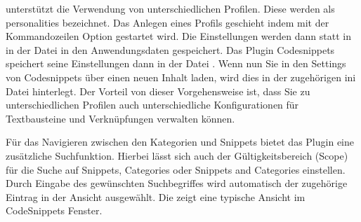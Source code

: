 \codeblocks unterstützt die Verwendung von unterschiedlichen Profilen. Diese werden als personalities bezeichnet. Das Anlegen eines Profils geschieht indem \codeblocks mit der Kommandozeilen Option  gestartet wird. Die Einstellungen werden dann statt in  in der Datei  in den Anwendungsdaten gespeichert. Das Plugin Codesnippets speichert seine Einstellungen dann in der Datei . Wenn nun Sie in den Settings von Codesnippets über  einen neuen Inhalt  laden, wird dies in der zugehörigen ini Datei hinterlegt. Der Vorteil von dieser Vorgehensweise ist, dass Sie zu unterschiedlichen Profilen auch unterschiedliche Konfigurationen für Textbausteine und Verknüpfungen verwalten können.

Für das Navigieren zwischen den Kategorien und Snippets bietet das Plugin eine zusätzliche Suchfunktion. Hierbei lässt sich auch der Gültigkeitsbereich (Scope) für die Suche auf Snippets, Categories oder Snippets and Categories einstellen. Durch Eingabe des gewünschten Suchbegriffes wird automatisch der zugehörige Eintrag in der Ansicht ausgewählt. Die  zeigt eine typische Ansicht im CodeSnippets Fenster.

